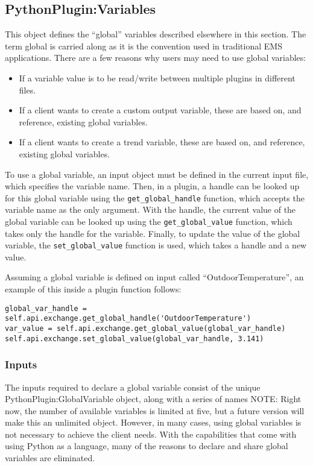 \subsection{PythonPlugin:Variables}

This object defines the ``global'' variables described elsewhere in this section.
The term global is carried along as it is the convention used in traditional EMS applications.
There are a few reasons why users may need to use global variables:
\begin{itemize}
    \item If a variable value is to be read/write between multiple plugins in different files.
    \item If a client wants to create a custom output variable, these are based on, and reference, existing global variables.
    \item If a client wants to create a trend variable, these are based on, and reference, existing global variables.
\end{itemize}

To use a global variable, an input object must be defined in the current input file, which specifies the variable name.
Then, in a plugin, a handle can be looked up for this global variable using the \verb=get_global_handle= function, which accepts the variable name as the only argument.
With the handle, the current value of the global variable can be looked up using the \verb=get_global_value= function, which takes only the handle for the variable.
Finally, to update the value of the global variable, the \verb=set_global_value= function is used, which takes a handle and a new value.

Assuming a global variable is defined on input called ``OutdoorTemperature'', an example of this inside a plugin function follows:

\begin{lstlisting}
global_var_handle = self.api.exchange.get_global_handle('OutdoorTemperature')
var_value = self.api.exchange.get_global_value(global_var_handle)
self.api.exchange.set_global_value(global_var_handle, 3.141)
\end{lstlisting}

\subsubsection{Inputs}

The inputs required to declare a global variable consist of the unique PythonPlugin:GlobalVariable object, along with a series of names
NOTE: Right now, the number of available variables is limited at five, but a future version will make this an unlimited object.
However, in many cases, using global variables is not necessary to achieve the client needs.
With the capabilities that come with using Python as a language, many of the reasons to declare and share global variables are eliminated.

